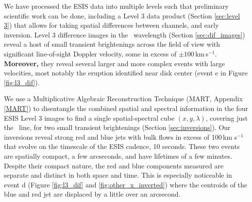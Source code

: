\documentclass[linenumbers,trackchanges]{aastex63}
\begin{document}
	We have processed the  ESIS data into multiple levels such that preliminary scientific work can be done, including a Level 3 data product (Section \ref{sec:level 3}) that allows for taking spatial differences between channels, and early inversion.
	Level 3 difference images in the \ov \ wavelength (Section \ref{sec:dif_images}) reveal a host of small transient brightenings across the field of view with significant line-of-sight Doppler velocity, some in excess of $\pm 100\,$km\,s$^{-1}$.
	\textbf{Moreover,} they reveal several larger and more complex events with large velocities, most notably the eruption identified near disk center (event e in Figure \ref{fig:l3_dif}).
	
	We use a Multiplicative Algebraic Reconstruction Technique (MART, Appendix \ref{MART}) to disentangle the combined spatial and spectral information in the four ESIS Level 3 images to find a single spatial-spectral cube $(x,y,\lambda)$, covering just the \ov\ line, for two small transient brightenings (Section \ref{sec:inversions}).
	Our inversions reveal strong red and blue jets with bulk flows in excess of 100\,km s$^{-1}$ that evolve on the timescale of the ESIS cadence, 10 seconds.
	These two events are spatially compact, a few arcseconds, and have lifetimes of a few minutes.
	Despite their compact nature, the red and blue components measured are separate and distinct in both space and time. 
	This is especially noticeable in event d (Figure \ref{fig:l3_dif} and \ref{fig:other_x_inverted}) where the centroids of the blue and red jet are displaced by a little over an arcsecond. 
	
\end{document}
